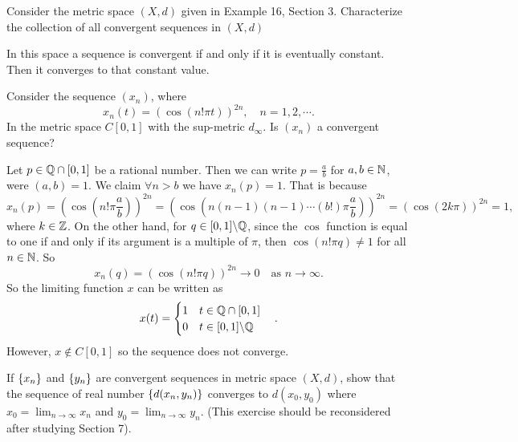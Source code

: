 \begin{problem}
	Consider the metric space $ (X,d) $ given in Example 16, Section 3. Characterize the collection of all convergent sequences in $ (X,d) $
\end{problem}

\begin{solution}
	In this space a sequence is convergent if and only if it is eventually constant. Then it converges to that constant value.
\end{solution}


\begin{problem}
	Consider the sequence $ (x_n) $, where 
	\[ x_n(t) = (\cos(n!\pi t))^{2n}, \quad n=1,2,\cdots. \]
	In the metric space $ C[0,1] $ with the sup-metric $ d_\infty $. Is $ (x_n) $ a convergent sequence?
\end{problem}
\begin{solution}
	Let $ p\in \mathbb{Q}\cap[0,1] $ be a rational number. Then we can write $ p = \frac{a}{b} $ for $ a,b\in \mathbb{N} $, were $ (a,b)=1 $. We claim $ \forall n>b $ we have $ x_n(p) = 1 $. That is because
	\[ x_n(p) = (\cos(n!\pi \frac{a}{b}))^{2n} = (\cos(n(n-1)(n-1)\cdots(b!)\pi\frac{a}{b}) )^{2n}= (\cos(2k\pi))^{2n} = 1,  \]
	where $ k\in \mathbb{Z} $. On the other hand, for $ q\in [0,1]\backslash\mathbb{Q} $, since the $ \cos $ function is equal to one if and only if its argument is a multiple of $ \pi $, then $ \cos(n!\pi q) \neq 1 $ for all $ n\in \mathbb{N} $. So
	\[ x_n(q) = (\cos(n!\pi q))^{2n} \to 0 \quad \text{as } n\to\infty. \]
	So the limiting function $ x $ can be written as
	\[ x(t) = \begin{cases}
		1 \quad  t\in \mathbb{Q}\cap[0,1] \\
		0 \quad  t\in [0,1]\backslash\mathbb{Q}
	\end{cases}. \]
	However, $ x \notin C[0,1] $ so the sequence does not converge.
\end{solution}



\begin{problem}
	If $ \{x_n\} $ and $ \{y_n\} $ are convergent sequences in metric space $ (X,d) $, show that the sequence of real number $ \{d(x_n,y_n)\} $ converges to $ d(x_0,y_0) $ where $ x_0=\lim_{n\to\infty}x_n $ and $ y_0 = \lim_{n\to\infty}y_n $. (This exercise should be reconsidered after studying Section 7).
\end{problem}


